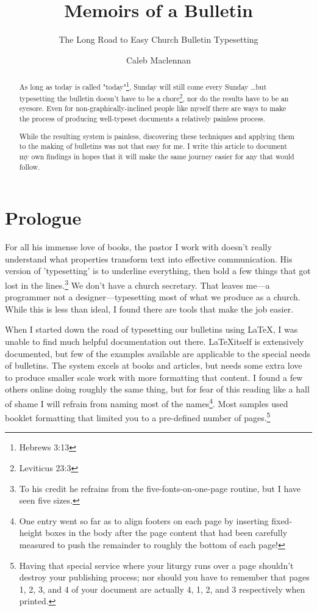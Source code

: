 \documentclass[12pt]{scrartcl}
\title{Memoirs of a Bulletin}
\subtitle{The Long Road to Easy Church Bulletin Typesetting}
\author{Caleb Maclennan}
\makeatletter
\let\svmaketitle\maketitle
\def\maketitle{\protected@edef\saved@title{\@title}%
	\svmaketitle%
	\let\@title\saved@title}%
\makeatother
\begin{document}
\maketitle

\begin{abstract}
	As long as today is called "today"\footnote{Hebrews 3:13}, Sunday will still come every Sunday \dots but typesetting the bulletin doesn't have to be a chore\footnote{Leviticus 23:3}, nor do the results have to be an eyesore. Even for non-graphically-inclined people like myself there are ways to make the process of producing well-typeset documents a relatively painless process.

While the resulting system is painless, discovering these techniques and applying them to the making of bulletins was not that easy for me. I write this article to document my own findings in hopes that it will make the same journey easier for any that would follow.
\end{abstract}

\section*{Prologue}

For all his immense love of books, the pastor I work with doesn't really understand what properties transform text into effective communication. His version of 'typesetting' is to underline everything, then bold a few things that got lost in the lines.\footnote{To his credit he refrains from the five-fonts-on-one-page routine, but I have seen five sizes.} We don't have a church secretary. That leaves me---a programmer not a designer---typesetting most of what we produce as a church. While this is less than ideal, I found there are tools that make the job easier.

When I started down the road of typesetting our bulletins using \LaTeX, I was unable to find much helpful documentation out there. \LaTeX itself is extensively documented, but few of the examples available are applicable to the special needs of bulletins. The system excels at books and articles, but needs some extra love to produce smaller scale work with more formatting that content. I found a few others online doing roughly the same thing, but for fear of this reading like a hall of shame I will refrain from naming most of the names\footnote{One entry went so far as to align footers on each page by inserting fixed-height boxes in the body after the page content that had been carefully measured to push the remainder to roughly the bottom of each page!}. Most samples used booklet formatting that limited you to a pre-defined number of pages.\footnote{Having that special service where your liturgy runs over a page shouldn't destroy your publishing process; nor should you have to remember that pages 1, 2, 3, and 4 of your document are actually 4, 1, 2, and 3 respectively when printed.}
\end{document}

